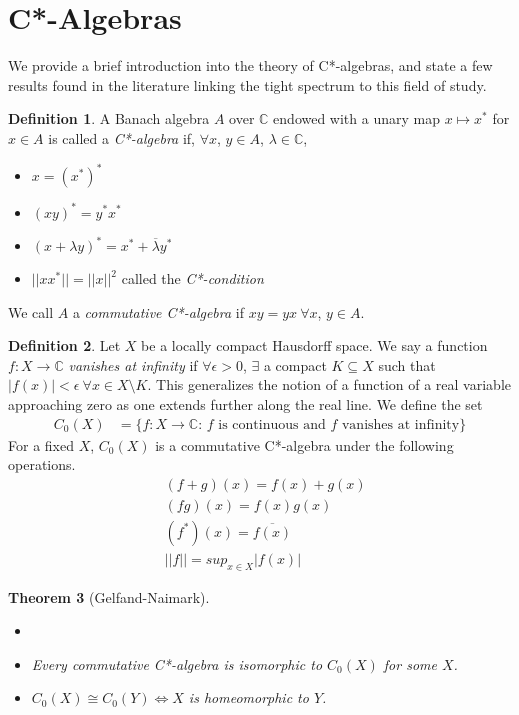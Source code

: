 \documentclass[12pt]{article}
\newtheorem{theorem}{Theorem}[section]
\theoremstyle{definition}
\newtheorem{definition}[theorem]{Definition}
\begin{document}
\section{C*-Algebras}
We provide a brief introduction into the theory of C*-algebras, and state
a few results found in the literature linking the tight spectrum to this field of study. 

\begin{definition}
    A Banach algebra $A$ over $\mathbb{C}$ endowed with a unary map $x \mapsto x^*$ for $x \in A$
    is called a \emph{C*-algebra} if, $\forall x$, $y \in A$, $\lambda \in \mathbb{C}$,
    \begin{itemize}
        \item $x = (x^*)^*$
        \item $(xy)^* = y^*x^*$
        \item $(x + \lambda y)^* = x^* + \overline{\lambda} y^*$
        \item $||xx^*|| = ||x||^2$ \quad called the \emph{C*-condition}
    \end{itemize}
    We call $A$ a \emph{commutative C*-algebra} if $xy = yx \ \forall x$, $y \in A$.
\end{definition}

\begin{definition}
    Let $X$ be a locally compact Hausdorff space. We say a function $f: X \to \mathbb{C}$
    \emph{vanishes at infinity} if $\forall \epsilon > 0$, $\exists$ a compact $K \subseteq X$
    such that $|f(x)| < \epsilon \ \forall x \in X \setminus K$. This generalizes the notion of
    a function of a real variable approaching zero as one extends further along the real line. We define the set
    \begin{align*}
        C_0(X) &= \{f: X \to \mathbb{C}\text{: $f$ is continuous and $f$ vanishes at infinity}\}
    \end{align*}
    For a fixed $X$, $C_0(X)$ is a commutative C*-algebra under the following operations.
    \begin{align*}
        &(f+g)(x) = f(x) + g(x) \\
        &(fg)(x) = f(x)g(x) \\
        &(f^*)(x) = \overline{f(x)} \\
        &||f|| = sup_{x \in X} |f(x)|
    \end{align*}
\end{definition}

\begin{theorem}[Gelfand-Naimark]
    \begin{itemize}
        \item[]
        \item Every commutative C*-algebra is isomorphic to $C_0(X)$ for some $X$.
        \item $C_0(X) \cong C_0(Y) \iff X$ is homeomorphic to $Y$.
    \end{itemize}
\end{theorem}
\end{document}
